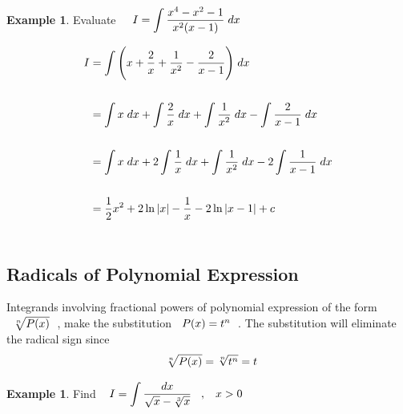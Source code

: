 \documentclass[11pt,a4paper]{article}
\theoremstyle{definition}
\newtheorem{exa}[thm]{Example}
\begin{document}
\begin{exa}


Evaluate $\hspace{0.4cm} \displaystyle{I = \int \dfrac{x^4 - x^2 - 1}{x^2 (x - 1)}\hspace{0.1cm} dx}$


\begin{align*}
I & = \int \Bigg( x + \frac{2}{x} + \frac{1}{x^2} - \frac{2}{x - 1}\Bigg)\hspace{0.1cm} dx\\\\
& = \int  x\hspace{0.1cm}dx  + \int \frac{2}{x}\hspace{0.1cm}dx  + \int \frac{1}{x^2}\hspace{0.1cm}dx - \int \frac{2}{x - 1}\hspace{0.1cm}dx\\\\
& = \int  x\hspace{0.1cm}dx  + 2\int \frac{1}{x}\hspace{0.1cm}dx  + \int \frac{1}{x^2}\hspace{0.1cm}dx -2 \int \frac{1}{x - 1}\hspace{0.1cm}dx\\\\
& = \dfrac{1}{2}x^2 + 2\ln |x| - \dfrac{1}{x} - 2\ln |x - 1| + c\\\\
\end{align*}

\pagebreak
\end{exa}

\subsection{Radicals of Polynomial Expression}
Integrands involving fractional powers of polynomial expression of the form $\hspace{0.2cm} \sqrt[n]{P(x)}\hspace{0.2cm}$, make the substitution $\hspace{0.2cm} P(x) = t^n\hspace{0.2cm}$. The substitution will eliminate the radical sign since $$\hspace{0.2cm} \sqrt[n]{P(x)} = \sqrt[n]{t^n} = t$$


\begin{exa}


Find $\hspace{0.3cm}\displaystyle{ I = \int \dfrac{dx}{\sqrt{x} - \sqrt[3]{x}}\hspace{0.3cm} , \hspace{0.3cm} x>0}$
\end{exa}
\end{document}
